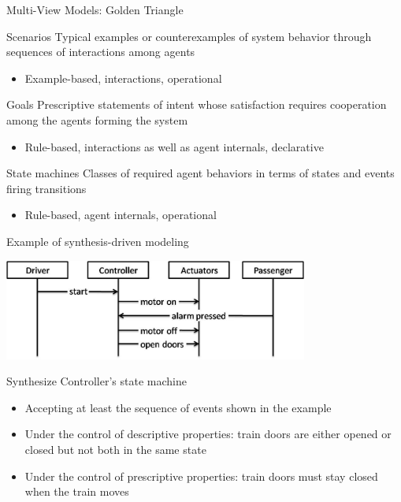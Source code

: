 \documentclass[11pt]{beamer}
\begin{document}
\begin{frame}{Multi-View Models: Golden Triangle} 
    \begin{block}{Scenarios} 
      Typical examples or counterexamples of system behavior through sequences of interactions among agents
      \begin{itemize} \item Example-based, interactions, operational \end{itemize}
    \end{block}
    \begin{block}{Goals} 
      Prescriptive statements of intent whose satisfaction requires cooperation among the agents forming the system
      \begin{itemize} \item Rule-based, interactions as well as agent internals, declarative \end{itemize}
    \end{block}
    \begin{block}{State machines} 
      Classes of required agent behaviors in terms of states and events firing transitions
      \begin{itemize} \item  Rule-based, agent internals, operational \end{itemize}
    \end{block}
\end{frame}

\begin{frame}{Example of synthesis-driven modeling} 
  \begin{center}
    \includegraphics[width=10cm]{train_scenario.jpg}
  \end{center}
  \begin{block}{Synthesize Controller's state machine}
    \begin{itemize}
      \item Accepting at least the sequence of events shown in the example
      \item Under the control of descriptive properties: train doors are either opened or closed but not both in the same state
      \item Under the control of prescriptive properties: train doors must stay closed when the train moves
    \end{itemize}
  \end{block}
\end{frame}
\end{document}
